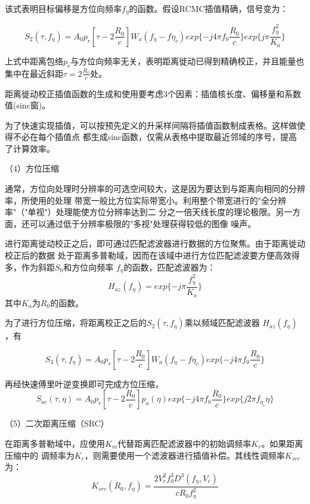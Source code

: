 \documentclass{article}
\begin{document}
该式表明目标偏移是方位向频率$f_\eta$的函数。假设RCMC插值精确，信号变为：

\begin{equation}
	S_2( \tau, f_{\eta} ) = A_0 p_r [\tau - 2\frac{R_0}{c}] W_a (f_{\eta} - f{\eta_{c}}) exp \{ -j4 \pi f_0 \frac{R_0}{c} \}exp\{j \pi \frac{f_{\eta}^2}{K_a}\}
\end{equation}

上式中距离包络$p_r$与方位向频率无关，表明距离徙动已得到精确校正，并且能量也集中在最近斜距$\tau = 2\frac{R_0}{c}$处。

距离徙动校正插值函数的生成和使用要考虑3个因素：插值核长度、偏移量和系数值(sinc窗)。

为了快速实现插值，可以按预先定义的升采样间隔将插值函数制成表格。这样做使得不必在每个插值点
都生成sinc函数，仅需从表格中提取最近邻域的序号，提高了计算效率。

（4）方位压缩

通常，方位向处理时分辨率的可选空间较大，这是因为要达到与距离向相同的分辨率，所使用的处理
带宽一般比方位实际带宽小。利用整个带宽进行的"全分辨率"（"单视"）处理能使方位分辨率达到二
分之一倍天线长度的理论极限。另一方面，还可以通过低于分辨率极限的"多视"处理获得较低的图像
噪声。

进行距离徙动校正之后，即可通过匹配滤波器进行数据的方位聚焦。由于距离徙动校正后的数据
处于距离多普勒域，因而在该域中进行方位匹配滤波要方便高效得多，作为斜距$S_0$和方位向频率 
$f_\eta$的函数，匹配滤波器为：
\begin{equation}
	H_{az}(f_\eta) = exp \{ -j \pi \frac{f_{\eta}^2}{K_a} \}
\end{equation}
其中$K_a$为$R_0$的函数。

为了进行方位压缩，将距离校正之后的$S_2( \tau, f_{\eta} )$乘以频域匹配滤波器
$H_{az}(f_\eta)$，有

\begin{equation}
	S_3( \tau, f_{\eta} ) = A_0 p_r [\tau - 2\frac{R_0}{c}] W_a (f_{\eta} - f{\eta_{c}}) exp \{ -j4 \pi f_0 \frac{R_0}{c} \}
\end{equation}

再经快速傅里叶逆变换即可完成方位压缩，
\begin{equation}
	S_{ac}( \tau, \eta) = A_0 p_r [\tau - 2\frac{R_0}{c}] p_a(\eta) exp \{ -j4 \pi f_0 \frac{R_0}{c} \} exp \{ j 2\pi f_{\eta _c} \eta \}
\end{equation}


（5）二次距离压缩（SRC）

在距离多普勒域中，应使用$K_m$代替距离匹配滤波器中的初始调频率$K_r$。如果距离压缩中的
调频率为$K_r$，则需要使用一个滤波器进行插值补偿。其线性调频率$K_{src}$为：
\begin{equation}
	K_{src}(R_0,f_{\eta}) = \frac{2 V_{r}^{2} f_{0}^{3} D^3 (f_\eta,V_r)}{cR_0f_\eta ^2}
\end{equation}
\end{document}
